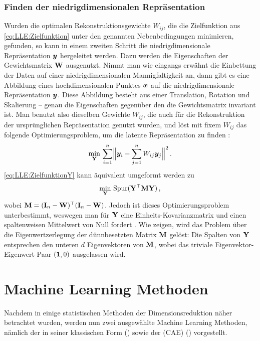 \subsubsection{Finden der niedrigdimensionalen Repräsentation}
\label{ch:MethodenDerDimRed:statistisch:LLE:FindenDerRepr}
Wurden die optimalen Rekonstruktionsgewichte $W_{ij}$, die die Zielfunktion aus
\eqref{eq:LLE:Zielfunktion} unter den genannten Nebenbedingungen minimieren, gefunden, so kann in einem zweiten Schritt die niedrigdimensionale Repräsentation $\bm{y}$ hergeleitet werden. Dazu werden die Eigenschaften der Gewichtsmatrix $\mathbf{W}$ ausgenutzt. Nimmt man wie eingangs erwähnt die Einbettung der Daten auf einer niedrigdimensionalen Mannigfaltigkeit an, dann gibt es eine Abbildung eines hochdimensionalen Punktes $\bm{x}$ auf die niedrigdimensionale Repräsentation $\bm{y}$. Diese Abbildung besteht aus einer Translation, Rotation und Skalierung -- genau die Eigenschaften gegenüber den die Gewichtsmatrix invariant ist. Man benutzt also dieselben Gewichte $W_{ij}$, die auch für die Rekonstruktion der ursprünglichen Repräsentation genutzt wurden, und löst mit fixem $W_{ij}$ das folgende Optimierungsproblem, um die latente Repräsentation zu finden \parencite[2324]{Roweis.2000}:
\begin{equation}
	\label{eq:LLE:ZielfunktionY}
	\min_{\mat{Y}}\, \sum_{i = 1}^n \norm[\Big]{\vect{y}_i - \sum_{j = 1}^n W_{ij}\vect{y}_j}^2 \, .
\end{equation}
\eqref{eq:LLE:ZielfunktionY} kann äquivalent umgeformt werden zu \parencite[4]{Ghojogh.2020}
\begin{equation}
	\min_{\mathbf{Y}}\, \operatorname{Spur}(\mathbf{Y}^\top \mathbf{M} \mathbf{Y}) \, ,
\end{equation}
wobei $\mathbf{M} = (\mathbf{I}_n - \mathbf{W})^\top (\mathbf{I}_n - \mathbf{W})$. Jedoch ist dieses Optimierungsproblem unterbestimmt, weswegen man für $\mathbf{Y}$ eine Einheits-Kovarianzmatrix und einen spaltenweisen Mittelwert von Null fordert \parencite[11]{Saul.2000}. Wie \textcite[3 -- 4]{Ghojogh.2020} zeigen, wird das Problem über die
Eigenwertzerlegung der dünnbesetzten Matrix $\mathbf{M}$ gelöst: Die Spalten von $\mathbf{Y}$ entsprechen
den unteren $d$ Eigenvektoren von $\mathbf{M}$, wobei das triviale Eigenvektor-Eigenwert-Paar $(\bm{1},
	0)$ ausgelassen wird.

\newpage
\section{Machine Learning Methoden}
\label{ch:MethodenDerDimRed:modern}
Nachdem in  einige statistischen Methoden der
Dimensionsreduktion näher betrachtet wurden, werden nun zwei ausgewählte Machine Learning Methoden,
nämlich der  in seiner klassischen Form
() sowie der  (CAE)
() vorgestellt.

